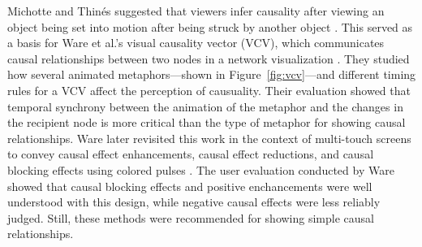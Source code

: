 Michotte and Thin\'es suggested that viewers infer causality after viewing an object being set into motion after being struck by another object \cite{michotte1963}.  This served as a basis for Ware et al.'s visual causality vector (VCV), which communicates causal relationships between two nodes in a network visualization \cite{ware1999}.  They studied how several animated metaphors---shown in Figure~\ref{fig:vcv}---and different timing rules for a VCV affect the perception of causuality.  Their evaluation showed that temporal synchrony between the animation of the metaphor and the changes in the recipient node is more critical than the type of metaphor for showing causal relationships.  Ware later revisited this work in the context of multi-touch screens to convey causal effect enhancements, causal effect reductions, and causal blocking effects using colored pulses \cite{ware2013}.  The user evaluation conducted by Ware showed that causal blocking effects and positive enchancements were well understood with this design, while negative causal effects were less reliably judged.  Still, these methods were recommended for showing simple causal relationships.

